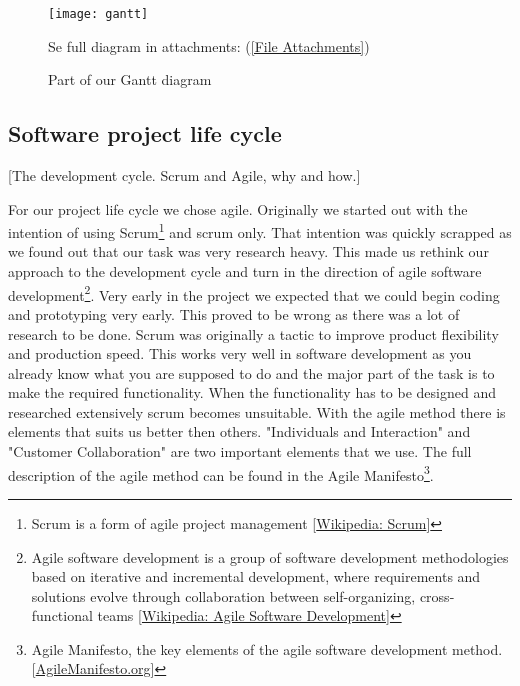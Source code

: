         \begin{figure}[h]
            \centering
            \texttt{[image: gantt]}
            \caption{Part of our Gantt diagram} Se full diagram in attachments: (\ref{File Attachments})
            \label{fig:gantt}
        \end{figure}
    
    \subsection{Software project life cycle}\label{Software project life cycle} [The development cycle. Scrum and Agile, why and how.]
    
    For our project life cycle we chose agile. Originally we started out with the intention of using Scrum\footnote
        {Scrum is a form of agile project management [\href{http://en.wikipedia.org/wiki/Scrum_(development)}{Wikipedia: Scrum}]} 
        and scrum only. That intention was quickly scrapped as we found out that our task was very research heavy. This made us rethink our approach to the development cycle and turn in the direction of agile software development\footnote
        {Agile software development is a group of software development methodologies based on iterative and incremental development, where requirements and solutions evolve through collaboration between self-organizing, cross-functional teams [\href{http://en.wikipedia.org/wiki/Agile_software_development.}{Wikipedia: Agile Software Development}]}.
    Very early in the project we expected that we could begin coding and prototyping very early. This proved to be wrong as there was a lot of research to be done. Scrum was originally a tactic to improve product flexibility and production speed. This works very well in software development as you already know what you are supposed to do and the major part of the task is to make the required functionality. When the functionality has to be designed and researched extensively scrum becomes unsuitable. 
    With the agile method there is elements that suits us better then others. "Individuals and Interaction" and "Customer Collaboration" are two important elements that we use. The full description of the agile method can be found in the Agile Manifesto\footnote
        {Agile Manifesto, the key elements of the agile software development method. [\href{http://http://agilemanifesto.org/}{AgileManifesto.org}]}.
